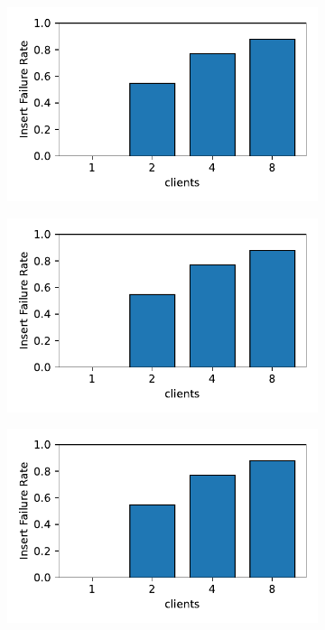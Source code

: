 \begin{figure}[t]
    \centering
    \begin{subfigure}{0.3\linewidth}
        \includegraphics[width=0.99\linewidth]{fig/optimistic_failures.pdf}
    \end{subfigure}
    \begin{subfigure}{0.3\linewidth}
        \includegraphics[width=0.99\linewidth]{fig/optimistic_failures.pdf}
    \end{subfigure}
    \begin{subfigure}{0.3\linewidth}
        \includegraphics[width=0.99\linewidth]{fig/optimistic_failures.pdf}

\end{subfigure}
\end{figure}
